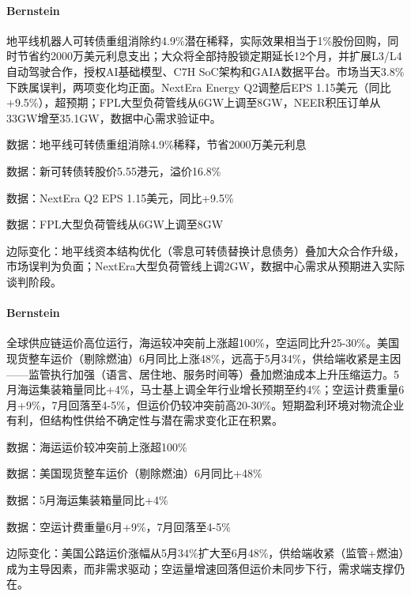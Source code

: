 \documentclass[11pt]{ctexart}
\begin{document}
\paragraph{Bernstein} 地平线机器人可转债重组消除约4.9\%潜在稀释，实际效果相当于1\%股份回购，同时节省约2000万美元利息支出；大众将全部持股锁定期延长12个月，并扩展L3/L4自动驾驶合作，授权AI基础模型、C7H SoC架构和GAIA数据平台。市场当天3.8\%下跌属误判，两项变化均正面。NextEra Energy Q2调整后EPS 1.15美元（同比+9.5\%），超预期；FPL大型负荷管线从6GW上调至8GW，NEER积压订单从33GW增至35.1GW，数据中心需求验证中。
{\small\color{refgray}数据：地平线可转债重组消除4.9\%稀释，节省2000万美元利息\par}
{\small\color{refgray}数据：新可转债转股价5.55港元，溢价16.8\%\par}
{\small\color{refgray}数据：NextEra Q2 EPS 1.15美元，同比+9.5\%\par}
{\small\color{refgray}数据：FPL大型负荷管线从6GW上调至8GW\par}
{\small\color{refgray}边际变化：地平线资本结构优化（零息可转债替换计息债务）叠加大众合作升级，市场误判为负面；NextEra大型负荷管线上调2GW，数据中心需求从预期进入实际谈判阶段。\par}
\paragraph{Bernstein} 全球供应链运价高位运行，海运较冲突前上涨超100\%，空运同比升25-30\%。美国现货整车运价（剔除燃油）6月同比上涨48\%，远高于5月34\%，供给端收紧是主因——监管执行加强（语言、居住地、服务时间等）叠加燃油成本上升压缩运力。5月海运集装箱量同比+4\%，马士基上调全年行业增长预期至约4\%；空运计费重量6月+9\%，7月回落至4-5\%，但运价仍较冲突前高20-30\%。短期盈利环境对物流企业有利，但结构性供给不确定性与潜在需求变化正在积累。
{\small\color{refgray}数据：海运运价较冲突前上涨超100\%\par}
{\small\color{refgray}数据：美国现货整车运价（剔除燃油）6月同比+48\%\par}
{\small\color{refgray}数据：5月海运集装箱量同比+4\%\par}
{\small\color{refgray}数据：空运计费重量6月+9\%，7月回落至4-5\%\par}
{\small\color{refgray}边际变化：美国公路运价涨幅从5月34\%扩大至6月48\%，供给端收紧（监管+燃油）成为主导因素，而非需求驱动；空运量增速回落但运价未同步下行，需求端支撑仍在。\par}
\end{document}
